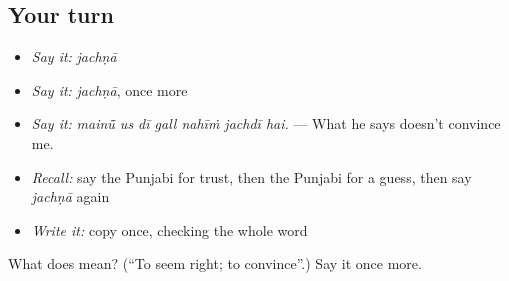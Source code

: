 \subsection*{Your turn}
\begin{itemize}
\raggedright
  \item \emph{Say it:} \emph{jachṇā}
  \item \emph{Say it:} \emph{jachṇā}, once more
  \item \emph{Say it:} \emph{mainū̃ us dī gall nahīṁ jachdī hai.} — What he says doesn't convince me.
  \item \emph{Recall:} say the Punjabi for trust, then the Punjabi for a guess, then say \emph{jachṇā} again
  \item \emph{Write it:} copy \textbf{} once, checking the whole word
\end{itemize}

\begin{tcolorbox}[breakable,colback=teal!4,colframe=teal!35!black,title={Before you move on}]
What does  mean? (\textquotedblleft{}To seem right; to convince\textquotedblright{}.) Say it once more.
\end{tcolorbox}
